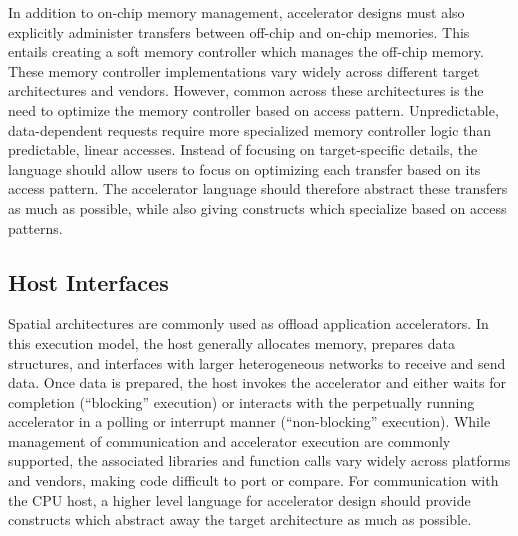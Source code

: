 In addition to on-chip memory management, accelerator designs must also explicitly administer transfers between off-chip and on-chip memories.
This entails creating a soft memory controller which manages the off-chip memory.
These memory controller implementations vary widely across different target architectures and vendors.
However, common across these architectures is the need to optimize the memory controller based on access pattern.
Unpredictable, data-dependent requests require more specialized memory controller logic than predictable, linear accesses.
Instead of focusing on target-specific details, the language should allow users to focus on optimizing each
transfer based on its access pattern. 
The accelerator language should therefore abstract these transfers as much as possible, while also giving constructs which specialize based on access patterns.

\subsection{Host Interfaces}
Spatial architectures are commonly used as offload application accelerators.
In this execution model, the host generally allocates memory, prepares data structures, and interfaces with larger heterogeneous networks to receive and send data.  
Once data is prepared, the host invokes the accelerator and either waits for completion (``blocking'' execution)
or interacts with the perpetually running accelerator in a polling or interrupt manner (``non-blocking'' execution).  
While management of communication and accelerator execution are commonly supported, the associated libraries and function calls vary widely across platforms and vendors, making code difficult to port or compare.
For communication with the CPU host, a higher level language for accelerator design should provide constructs which abstract away the target architecture as much as possible.


